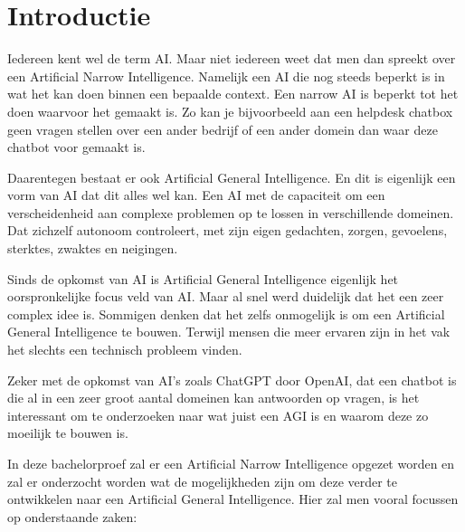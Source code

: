
\section{Introductie} %
\label{sec:introductie}

Iedereen kent wel de term AI. Maar niet iedereen weet dat men dan spreekt over een Artificial Narrow Intelligence. Namelijk een AI die nog steeds beperkt is in wat het kan doen binnen een bepaalde context. Een narrow AI is beperkt tot het doen waarvoor het gemaakt is. Zo kan je bijvoorbeeld aan een helpdesk chatbox geen vragen stellen over een ander bedrijf of een ander domein dan waar deze chatbot voor gemaakt is. \linebreak

Daarentegen bestaat er ook Artificial General Intelligence. En dit is eigenlijk een vorm van AI dat dit alles wel kan. Een AI met de capaciteit om een verscheidenheid aan complexe problemen op te lossen in verschillende domeinen. Dat zichzelf autonoom controleert, met zijn eigen gedachten, zorgen, gevoelens, sterktes, zwaktes en neigingen. \linebreak

Sinds de opkomst van AI is Artificial General Intelligence eigenlijk het oorspronkelijke focus veld van AI. Maar al snel werd duidelijk dat het een zeer complex idee is. Sommigen denken dat het zelfs onmogelijk is om een Artificial General Intelligence te bouwen. Terwijl mensen die meer ervaren zijn in het vak het slechts een technisch probleem vinden. \linebreak

Zeker met de opkomst van AI's zoals ChatGPT door \hfill \break OpenAI, dat een chatbot is die al in een zeer groot aantal domeinen kan antwoorden op vragen, is het interessant om te onderzoeken naar wat juist een AGI is en waarom deze zo moeilijk te bouwen is. \linebreak

In deze bachelorproef zal er een Artificial Narrow Intelligence opgezet worden en zal er onderzocht worden wat de mogelijkheden zijn om deze verder te ontwikkelen naar een Artificial General Intelligence. Hier zal men vooral focussen op onderstaande zaken: \linebreak

